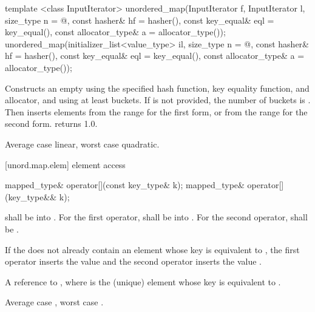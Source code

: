 %
\begin{itemdecl}
template <class InputIterator>
  unordered_map(InputIterator f, InputIterator l,
                size_type n = @\seebelow@,
                const hasher& hf = hasher(),
                const key_equal& eql = key_equal(),
                const allocator_type& a = allocator_type());
unordered_map(initializer_list<value_type> il,
              size_type n = @\seebelow@,
              const hasher& hf = hasher(),
              const key_equal& eql = key_equal(),
              const allocator_type& a = allocator_type());
\end{itemdecl}

\begin{itemdescr}
\pnum
\effects Constructs an empty  using the
specified hash function, key equality function, and allocator, and
using at least  buckets. If  is not
provided, the number of buckets is . Then
inserts elements from the range 
for the first form, or from the range
 for the second form.
 returns 1.0.

\pnum
\complexity Average case linear, worst case quadratic.
\end{itemdescr}

[unord.map.elem]{ element access}

%
%
%
\begin{itemdecl}
mapped_type& operator[](const key_type& k);
mapped_type& operator[](key_type&& k);
\end{itemdecl}

\begin{itemdescr}
\pnum
\requires {} shall be  into .
For the first operator,  shall be  into .
For the second operator,  shall be .

\pnum
\effects If the  does not already contain
an element whose key is equivalent to , the first operator inserts
the value
and the second operator inserts the value
.


\pnum
\returns A reference to , where 
is the (unique) element whose key is equivalent to .

\pnum
\complexity Average case , worst case .
\end{itemdescr}

